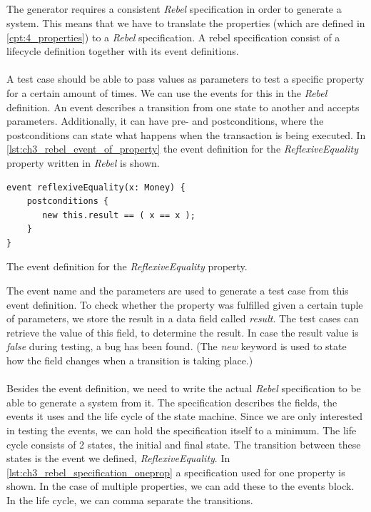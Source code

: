 \subsection{\tfPhaseOne{}}
\label{sct:3_prop_to_rebel}
The generator requires a consistent \textit{Rebel} specification in order to generate a system. This means that we have to translate the properties (which are defined in \autoref{cpt:4_properties}) to a \textit{Rebel} specification. A rebel specification consist of a lifecycle definition together with its event definitions.\\
\\
A test case should be able to pass values as parameters to test a specific property for a certain amount of times. We can use the events for this in the \textit{Rebel} definition. An event describes a transition from one state to another and accepts parameters. Additionally, it can have pre- and postconditions, where the postconditions can state what happens when the transaction is being executed. In \autoref{lst:ch3_rebel_event_of_property} the event definition for the \textit{ReflexiveEquality} property written in \textit{Rebel} is shown.
\FloatBarrier
\begin{sourcecode}[h!]
\begin{lstlisting}[language=Rebel]
event reflexiveEquality(x: Money) {
    postconditions {
       new this.result == ( x == x );
    }
}
\end{lstlisting}
\caption{The event definition for the \textit{ReflexiveEquality} property.}
\label{lst:ch3_rebel_event_of_property}
\end{sourcecode}
\FloatBarrier
The event name and the parameters are used to generate a test case from this event definition. To check whether the property was fulfilled given a certain tuple of parameters, we store the result in a data field called \textit{result}. The test cases can retrieve the value of this field, to determine the result. In case the result value is \textit{false} during testing, a bug has been found. (The \textit{new} keyword is used to state how the field changes when a transition is taking place.)\\
\\
Besides the event definition, we need to write the actual \textit{Rebel} specification to be able to generate a system from it. The specification describes the fields, the events it uses and the life cycle of the state machine. Since we are only interested in testing the events, we can hold the specification itself to a minimum. The life cycle consists of 2 states, the initial and final state. The transition between these states is the event we defined, \textit{ReflexiveEquality}. In \autoref{lst:ch3_rebel_specification_oneprop} a specification used for one property is shown. In the case of multiple properties, we can add these to the events block. In the life cycle, we can comma separate the transitions.
